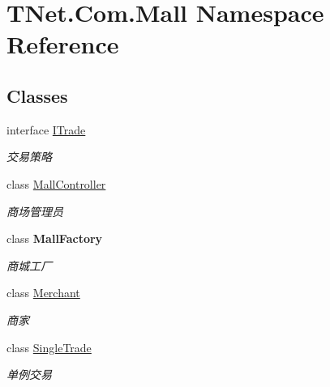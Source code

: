 \hypertarget{namespace_t_net_1_1_com_1_1_mall}{}\section{T\+Net.\+Com.\+Mall Namespace Reference}
\label{namespace_t_net_1_1_com_1_1_mall}
\subsection*{Classes}
\begin{DoxyCompactItemize}
\item 
interface \mbox{\hyperlink{interface_t_net_1_1_com_1_1_mall_1_1_i_trade}{I\+Trade}}
\begin{DoxyCompactList}\small\item\em 交易策略 \end{DoxyCompactList}\item 
class \mbox{\hyperlink{class_t_net_1_1_com_1_1_mall_1_1_mall_controller}{Mall\+Controller}}
\begin{DoxyCompactList}\small\item\em 商场管理员 \end{DoxyCompactList}\item 
class {\bfseries Mall\+Factory}
\begin{DoxyCompactList}\small\item\em 商城工厂 \end{DoxyCompactList}\item 
class \mbox{\hyperlink{class_t_net_1_1_com_1_1_mall_1_1_merchant}{Merchant}}
\begin{DoxyCompactList}\small\item\em 商家 \end{DoxyCompactList}\item 
class \mbox{\hyperlink{class_t_net_1_1_com_1_1_mall_1_1_single_trade}{Single\+Trade}}
\begin{DoxyCompactList}\small\item\em 单例交易 \end{DoxyCompactList}\end{DoxyCompactItemize}
